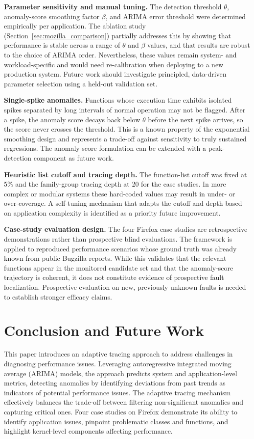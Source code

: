 \documentclass[pdflatex,sn-nature]{sn-jnl}%
\theoremstyle{thmstyleone}%
\theoremstyle{thmstyletwo}%
\theoremstyle{thmstylethree}%
\begin{document}
\textbf{Parameter sensitivity and manual tuning.} The detection threshold $\theta$, anomaly-score smoothing factor $\beta$, and ARIMA error threshold were determined empirically per application. The ablation study (Section~\ref{sec:mozilla_comparison}) partially addresses this by showing that performance is stable across a range of $\theta$ and $\beta$ values, and that results are robust to the choice of ARIMA order. Nevertheless, these values remain system- and workload-specific and would need re-calibration when deploying to a new production system. Future work should investigate principled, data-driven parameter selection using a held-out validation set.

\textbf{Single-spike anomalies.} Functions whose execution time exhibits isolated spikes separated by long intervals of normal operation may not be flagged. After a spike, the anomaly score decays back below $\theta$ before the next spike arrives, so the score never crosses the threshold. This is a known property of the exponential smoothing design and represents a trade-off against sensitivity to truly sustained regressions. The anomaly score formulation can be extended with a peak-detection component as future work.

\textbf{Heuristic list cutoff and tracing depth.} The function-list cutoff was fixed at 5\% and the family-group tracing depth at 20 for the case studies. In more complex or modular systems these hard-coded values may result in under- or over-coverage. A self-tuning mechanism that adapts the cutoff and depth based on application complexity is identified as a priority future improvement.

\textbf{Case-study evaluation design.} The four Firefox case studies are retrospective demonstrations rather than prospective blind evaluations. The framework is applied to reproduced performance scenarios whose ground truth was already known from public Bugzilla reports. While this validates that the relevant functions appear in the monitored candidate set and that the anomaly-score trajectory is coherent, it does not constitute evidence of prospective fault localization. Prospective evaluation on new, previously unknown faults is needed to establish stronger efficacy claims.


\section{Conclusion and Future Work}\label{conc}
This paper introduces an adaptive tracing approach to address challenges in diagnosing performance issues. Leveraging autoregressive integrated moving average (ARIMA) models, the approach predicts system and application-level metrics, detecting anomalies by identifying deviations from past trends as indicators of potential performance issues. The adaptive tracing mechanism effectively balances the trade-off between filtering non-significant anomalies and capturing critical ones. Four case studies on Firefox demonstrate its ability to identify application issues, pinpoint problematic classes and functions, and highlight kernel-level components affecting performance.
\end{document}
